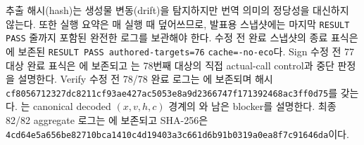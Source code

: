 추출 해시(hash)는 생성물 변동(drift)을 탐지하지만 번역 의미의 정당성을
대신하지 않는다. 또한 실행 요약은 매 실행 때 덮어쓰므로, 발표용 스냅샷에는
마지막 \texttt{RESULT PASS} 줄까지 포함된 완전한 로그를 보관해야 한다.
수정 전 완료 스냅샷의 종료 표식은
에 보존된
\texttt{RESULT PASS authored-targets=76}\newline
\texttt{cache=-no-eco}다. Sign 수정 전 77대상 완료 표식은
에 보존되고
는 78번째 대상의 직접 actual-call control과
중단 판정을 설명한다. Verify 수정 전 78/78 완료 로그는
에 보존되며
해시 \texttt{cf8056712327dc8211cf93ae427ac5053e8a9d2366747f171392468ac3ff0d75}를
갖는다. 는 canonical decoded
\((x,v,h,c)\) 경계의 와 남은 blocker를
설명한다. 최종 82/82 aggregate 로그는
에 보존되고 SHA-256은
\texttt{4cd64e5a656be82710bca1410c4d19403a3c661d6b91b0319a0ea8f7c91646da}이다.

